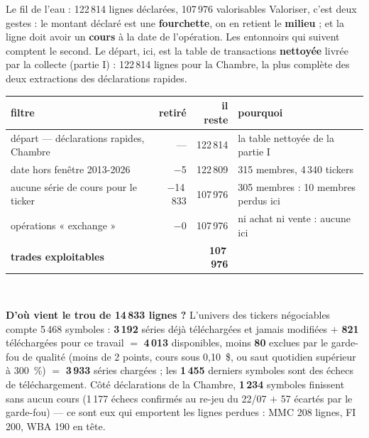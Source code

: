 \documentclass[11pt,aspectratio=169]{beamer}
\newcommand{\defl}[1]{{\scriptsize\color{black!55}#1}}
\begin{document}
\begin{frame}{Le fil de l'eau : 122\,814 lignes déclarées, 107\,976 valorisables}
  \footnotesize
  Valoriser, c'est deux gestes : le montant déclaré est une \textbf{fourchette}, on en retient le
  \textbf{milieu} ; et la ligne doit avoir un \textbf{cours} à la date de l'opération. Les entonnoirs
  qui suivent comptent le second. Le départ, ici, est la table de transactions \textbf{nettoyée} livrée par la collecte (partie I) :
  122\,814 lignes pour la Chambre, la plus complète des deux extractions des déclarations rapides.
  \medskip

  \centering\scriptsize
  \begin{tabular}{l r r l}
    \toprule
    filtre & retiré & il reste & pourquoi \\
    \midrule
    départ --- déclarations rapides, Chambre & --- & 122\,814 & \defl{la table nettoyée de la partie I} \\
    date hors fenêtre 2013-2026        & $-$5      & 122\,809 & \defl{315 membres, 4\,340 tickers} \\
    aucune série de cours pour le ticker & $-$14\,833 & 107\,976 & \defl{305 membres : 10 membres perdus ici} \\
    opérations « exchange »            & $-$0      & 107\,976 & \defl{ni achat ni vente : aucune ici} \\
    \midrule
    \textbf{trades exploitables} & & \textbf{107\,976} & \\
    \bottomrule
  \end{tabular}\\[3mm]

  \raggedright\footnotesize
  \textbf{D'où vient le trou de 14\,833 lignes ?} L'univers des tickers négociables compte
  5\,468 symboles : \textbf{3\,192} séries déjà téléchargées et jamais modifiées $+$ \textbf{821}
  téléchargées pour ce travail $=$ \textbf{4\,013} disponibles, moins \textbf{80} exclues par le
  garde-fou de qualité (moins de 2 points, cours sous 0,10~\$, ou saut quotidien supérieur à
  300~\%) $=$ \textbf{3\,933} séries chargées ; les \textbf{1\,455} derniers symboles sont des échecs
  de téléchargement. Côté déclarations de la Chambre, \textbf{1\,234} symboles finissent sans aucun
  cours (1\,177 échecs confirmés au re-jeu du 22/07 $+$ 57 écartés par le garde-fou) --- ce sont eux qui emportent
  les lignes perdues : MMC 208 lignes, FI 200, WBA 190 en tête.
\end{frame}
\end{document}
